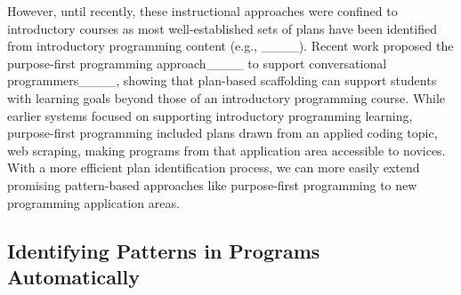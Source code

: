 However, until recently, these instructional approaches were confined to introductory courses as most well-established sets of plans have been identified from introductory programming content (e.g., ____). Recent work proposed the purpose-first programming approach____ to support conversational programmers____, showing that plan-based scaffolding can support students with learning goals beyond those of an introductory programming course. While earlier systems focused on supporting introductory programming learning, purpose-first programming included plans drawn from an applied coding topic, web scraping, making programs from that application area accessible to novices. With a more efficient plan identification process, we can more easily extend promising pattern-based approaches like purpose-first programming to new programming application areas. 




\subsection{Identifying Patterns in Programs Automatically}


